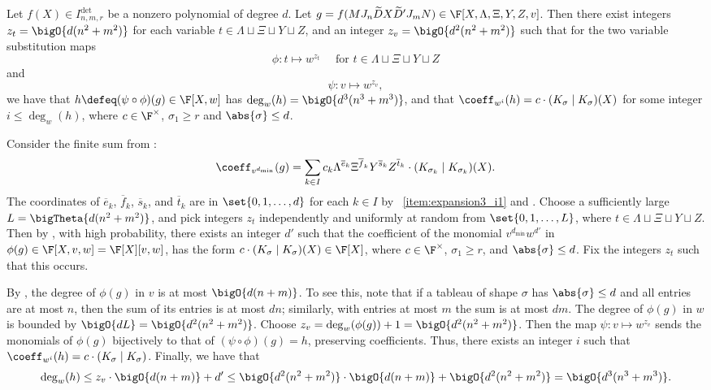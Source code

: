 \documentclass[letterpaper, 11pt]{amsart}
\begin{document}
\begin{lem}\label{lem:univariate}
Let $f(X) \in I^{\det}_{n, m, r}$ 
be a nonzero polynomial of degree $d$.
Let $g=f(M J_n \widetilde{D} X \widetilde{D}' J_m N) \in \F[X, \Lambda, \Xi, Y, Z, v]$.
Then there exist integers $z_t = \bigO{d(n^2+m^2)}$ for each variable $t\in \Lambda\sqcup\Xi\sqcup Y\sqcup Z$, and an integer $z_v = \bigO{d^2(n^2+m^2)}$ such that for the two variable substitution maps 
\[
    \phi\colon t \mapsto w^{z_t} \quad\text{ for } t\in \Lambda \sqcup \Xi \sqcup Y \sqcup Z
\]
and
\[
    \psi\colon v \mapsto w^{z_v},
\]
we have that $h \defeq (\psi\circ\phi)(g)\in\F[X,w]$ has $\deg_w(h) = \bigO{d^3(n^3+m^3)}$, and that $\coeff_{w^i}(h) = c\cdot (K_\sigma\mid K_\sigma)(X)$ for some integer $i\leq \deg_w(h)$, where $c\in\F^\times$, $\sigma_1\geq r$ and $\abs{\sigma} \leq d$.
\end{lem}
\begin{pf}
Consider the finite sum from :
\[
\coeff_{v^{d_{\min}}}(g)=\sum_{k\in I} c_k \Lambda^{\overline{e}_k}\Xi^{\overline{f}_k}Y^{\overline{s}_k}Z^{\overline{t}_k}\cdot (K_{\sigma_k}\mid K_{\sigma_k})(X).
\]
The coordinates of $\overline{e}_k$, $\overline{f}_k$, $\overline{s}_k$, and $\overline{t}_k$ are in $\set{0,1,\dots,d}$ for each $k \in I$ by ~\eqref{item:expansion3_i1} and .
Choose a sufficiently large $L=\bigTheta{d(n^2+m^2)}$, and pick integers $z_t$ independently and uniformly at random from $ \set{0, 1, \ldots, L}$, where $t\in \Lambda\sqcup\Xi\sqcup Y\sqcup Z$.
Then by , with high probability, there exists an integer $d'$ such that the coefficient of the monomial $v^{d_{\min}}w^{d'}$ in $\phi(g)\in\F[X,v,w]=\F[X][v,w]$, has the form $c\cdot (K_\sigma\mid K_\sigma)(X) \in \F[X]$, where $c\in \F^\times$, $\sigma_1\geq r$, and $\abs{\sigma} \leq d$.
Fix the integers $z_t$ such that this occurs.

By , the degree of $\phi(g)$ in $v$ is at most $\bigO{d(n+m)}$.
To see this, note that if a tableau of shape $\sigma$ has $\abs{\sigma}\leq d$ and all entries are at most $n$, then the sum of its entries is at most $dn$; similarly, with entries at most $m$ the sum is at most $dm$.
The degree of $\phi(g)$ in $w$ is bounded by $\bigO{dL} = \bigO{d^2(n^2+m^2)}$.
Choose $z_v = \deg_w(\phi(g))+1 = \bigO{d^2(n^2+m^2)}$.
Then the map $\psi: v\mapsto w^{z_v}$ sends the monomials of $\phi(g)$ bijectively to that of $(\psi\circ\phi)(g)=h$, preserving coefficients.
Thus, there exists an integer $i$ such that $\coeff_{w^i}(h)=c\cdot (K_\sigma\mid K_\sigma)$.
Finally, we have that
\[
    \deg_w(h) \leq z_v \cdot \bigO{d(n+m)} + d' \leq \bigO{d^2 (n^2 + m^2)} \cdot \bigO{d(n + m)} + \bigO{d^2(n^2+m^2)} = \bigO{d^3(n^3 + m^3)}.
\]
\end{pf}
\end{document}
